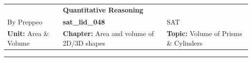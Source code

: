 \documentclass[11pt,paper=a4,answers]{exam}
\begin{document}
\begin{center}
    \centering
    \renewcommand{\arraystretch}{1.5}
    \begin{tabularx}{\textwidth}{YYY}
    & \normalsize\bf{{\Large{{Quantitative Reasoning}}}} & \\
    By Preppeo & \normalsize\bf{{sat\_lid\_048}} & SAT\\
    \normalsize{{\textbf{{Unit:}} Area \& Volume}} & \normalsize{{\textbf{{Chapter:}} Area and volume of 2D/3D shapes}} & \normalsize{{\textbf{{Topic:}} Volume of Prisms \& Cylinders}} \\
    \end{tabularx}
\end{center}
\par\noindent\rule{\textwidth}{1pt}
\end{document}
